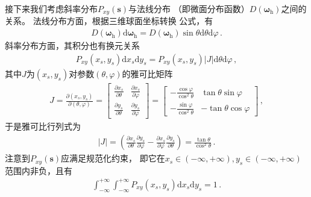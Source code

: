 接下来我们考虑斜率分布$P_{xy}({\bm s})$与法线分布
（即微面分布函数）$D({\bm\omega}_{\mathrm{h}})$之间的关系。
法线分布方面，根据三维球面坐标转换
公式，有
\begin{align}\label{eq:08-ex01-D_sphere}
    D({\bm\omega}_{\mathrm{h}})\mathrm{d}{\bm\omega}_{\mathrm{h}}
    =D({\bm\omega}_{\mathrm{h}})\sin\theta\mathrm{d}\theta\mathrm{d}\varphi\, .
\end{align}
斜率分布方面，其积分也有换元关系
\begin{align}\label{eq:08-ex01-Pxy-Jacobian}
    P_{xy}(x_s,y_s)\mathrm{d}x_s\mathrm{d}y_s
    =P_{xy}(x_s,y_s)|J|\mathrm{d}\theta\mathrm{d}\varphi\, ,
\end{align}
其中$J$为$(x_s,y_s)$对参数$(\theta,\varphi)$的雅可比矩阵
\begin{align}
    J=\displaystyle\frac{\partial(x_s,y_s)}{\partial(\theta,\varphi)}
    =\displaystyle\left[\begin{array}{cc}
            \displaystyle\frac{\partial x_s}{\partial \theta} &
            \displaystyle\frac{\partial x_s}{\partial \varphi}  \\
            \displaystyle\frac{\partial y_s}{\partial \theta} &
            \displaystyle\frac{\partial y_s}{\partial \varphi}
        \end{array}\right]
    =\displaystyle\left[\begin{array}{rr}
            \displaystyle -\frac{\cos\varphi}{\cos^2\theta} &
            \displaystyle \tan\theta\sin\varphi               \\
            \displaystyle -\frac{\sin\varphi}{\cos^2\theta} &
            \displaystyle -\tan\theta\cos\varphi
        \end{array}\right]\, ,
\end{align}
于是雅可比行列式为
\begin{align}\label{eq:08-ex01-Jacobian-slope-normals}
    |J|=\left(\frac{\partial x_s}{\partial \theta}\frac{\partial y_s}{\partial \varphi}
    -\frac{\partial x_s}{\partial \varphi}\frac{\partial y_s}{\partial \theta}\right)
    =\frac{\tan\theta}{\cos^2\theta}\, .
\end{align}
注意到$P_{xy}({\bm s})$应满足规范化约束，
即它在$x_s\in(-\infty,+\infty),y_s\in(-\infty,+\infty)$范围内非负，且有
\begin{align}
    \int_{-\infty}^{+\infty}\int_{-\infty}^{+\infty}
    P_{xy}(x_s,y_s)\mathrm{d}x_s\mathrm{d}y_s=1\, .
\end{align}
